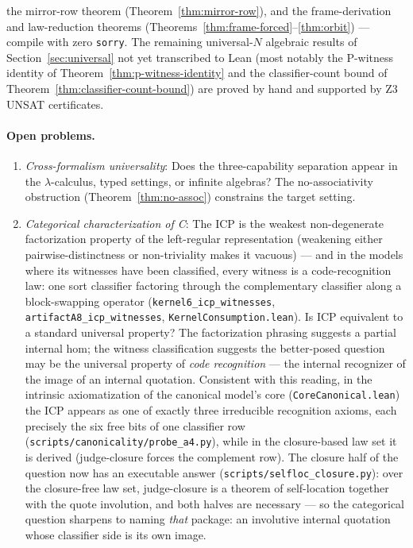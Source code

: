 \documentclass[sigconf,screen]{acmart}
\theoremstyle{remark}
\begin{document}
the mirror-row theorem (Theorem~\ref{thm:mirror-row}), and the frame-derivation and law-reduction theorems (Theorems~\ref{thm:frame-forced}--\ref{thm:orbit}) --- compile with zero \texttt{sorry}. The remaining universal-$N$ algebraic results of Section~\ref{sec:universal} not yet transcribed to Lean (most notably the P-witness identity of Theorem~\ref{thm:p-witness-identity} and the classifier-count bound of Theorem~\ref{thm:classifier-count-bound}) are proved by hand and supported by Z3 UNSAT certificates.

\paragraph{Open problems.}
\begin{enumerate}
  \item \emph{Cross-formalism universality}: Does the three-capability separation appear in the $\lambda$-calculus, typed settings, or infinite algebras? The no-associativity obstruction (Theorem~\ref{thm:no-assoc}) constrains the target setting.
  \item \emph{Categorical characterization of C}: The ICP is the weakest non-degenerate factorization property of the left-regular representation (weakening either pairwise-distinctness or non-triviality makes it vacuous) --- and in the models where its witnesses have been classified, every witness is a code-recognition law: one sort classifier factoring through the complementary classifier along a block-swapping operator (\texttt{kernel6\_icp\_witnesses}, \texttt{artifactA8\_icp\_witnesses}, \texttt{KernelConsumption.lean}). Is ICP equivalent to a standard universal property? The factorization phrasing suggests a partial internal hom; the witness classification suggests the better-posed question may be the universal property of \emph{code recognition} --- the internal recognizer of the image of an internal quotation. Consistent with this reading, in the intrinsic axiomatization of the canonical model's core (\texttt{CoreCanonical.lean}) the ICP appears as one of exactly three irreducible recognition axioms, each precisely the six free bits of one classifier row (\texttt{scripts/canonicality/probe\_a4.py}), while in the closure-based law set it is derived (judge-closure forces the complement row). The closure half of the question now has an executable answer (\texttt{scripts/selfloc\_closure.py}): over the closure-free law set, judge-closure is a theorem of self-location together with the quote involution, and both halves are necessary --- so the categorical question sharpens to naming \emph{that} package: an involutive internal quotation whose classifier side is its own image.

\end{enumerate}
\end{document}
